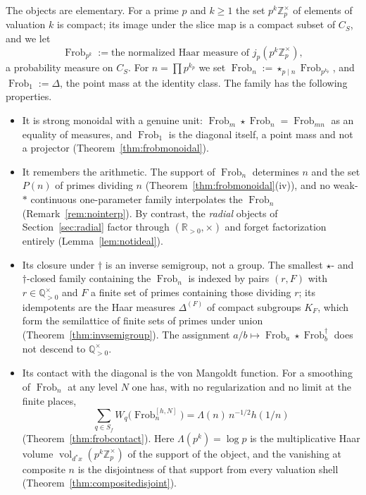 \documentclass[11pt]{amsart}
\theoremstyle{definition}
\theoremstyle{remark}
\newcommand{\R}{\mathbb R}
\newcommand{\Z}{\mathbb Z}
\newcommand{\Q}{\mathbb Q}
\newcommand{\Frob}{\operatorname{Frob}}
\newcommand{\vol}{\operatorname{vol}}
\begin{document}
The objects are elementary.  For a prime $p$ and $k\ge1$ the set
$p^k\Z_p^\times$ of elements of valuation $k$ is compact; its image under the
slice map is a compact subset of $C_S$, and we let
\[
   \Frob_{p^k}:=\text{the normalized Haar measure of } j_p(p^k\Z_p^\times),
\]
a probability measure on $C_S$.  For $n=\prod p^{k_p}$ we set
$\Frob_n:=\star_{p\mid n}\Frob_{p^{k_p}}$, and $\Frob_1:=\Delta$, the point
mass at the identity class.  The family has the following properties.
\begin{itemize}
\item It is strong monoidal with a genuine unit: $\Frob_m\star\Frob_n
=\Frob_{mn}$ as an equality of measures, and $\Frob_1$ is the diagonal
itself, a point mass and not a projector (Theorem~\ref{thm:frobmonoidal}).
\item It remembers the arithmetic.  The support of $\Frob_n$ determines $n$
and the set $P(n)$ of primes dividing $n$ (Theorem~\ref{thm:frobmonoidal}(iv)),
and no weak-$*$ continuous one-parameter family interpolates the $\Frob_n$
(Remark~\ref{rem:nointerp}).  By contrast, the \emph{radial} objects of
Section~\ref{sec:radial} factor through $(\R_{>0},\times)$ and forget
factorization entirely (Lemma~\ref{lem:notideal}).
\item Its closure under $\dagger$ is an inverse semigroup, not a group.  The
smallest $\star$- and $\dagger$-closed family containing the $\Frob_n$ is
indexed by pairs $(r,F)$ with $r\in\Q_{>0}^\times$ and $F$ a finite set of
primes containing those dividing $r$; its idempotents are the Haar measures
$\Delta^{(F)}$ of compact subgroups $K_F$, which form the semilattice of finite
sets of primes under union (Theorem~\ref{thm:invsemigroup}).  The assignment
$a/b\mapsto\Frob_a\star\Frob_b^\dagger$ does not descend to $\Q_{>0}^\times$.
\item Its contact with the diagonal is the von Mangoldt function.  For a
smoothing of $\Frob_n$ at any level $N$ one has, with no regularization and
no limit at the finite places,
\[
   \sum_{q\in S_f}W_q\bigl(\Frob_n^{[h,N]}\bigr)=\Lambda(n)\,n^{-1/2}h(1/n)
\]
(Theorem~\ref{thm:frobcontact}).  Here $\Lambda(p^k)=\log p$ is the
multiplicative Haar volume $\vol_{d^*x}(p^k\Z_p^\times)$ of the support of the
object, and the vanishing at composite $n$ is the disjointness of that support
from every valuation shell (Theorem~\ref{thm:compositedisjoint}).
\end{itemize}
\end{document}
